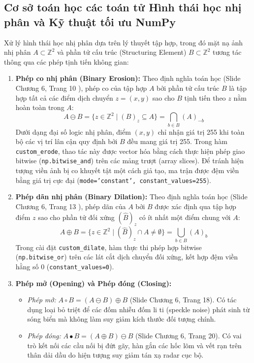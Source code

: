 \subsection{Cơ sở toán học các toán tử Hình thái học nhị phân và Kỹ thuật tối ưu NumPy}
\label{subsec:morphology_theory}
Xử lý hình thái học nhị phân dựa trên lý thuyết tập hợp, trong đó mặt nạ ảnh nhị phân $A \subset \mathbb{Z}^2$ và phần tử cấu trúc (Structuring Element) $B \subset \mathbb{Z}^2$ tương tác thông qua các phép tịnh tiến không gian:

\begin{enumerate}
    \item \textbf{Phép co nhị phân (Binary Erosion):}
    Theo định nghĩa toán học (Slide Chương 6, Trang 10 \cite{toan2024xla}), phép co của tập hợp $A$ bởi phần tử cấu trúc $B$ là tập hợp tất cả các điểm dịch chuyển $z = (x, y)$ sao cho $B$ tịnh tiến theo $z$ nằm hoàn toàn trong $A$:
    \begin{equation}
        A \ominus B = \{ z \in \mathbb{Z}^2 \mid (B)_z \subseteq A \} = \bigcap_{b \in B} (A)_{-b}
    \end{equation}
    Dưới dạng đại số logic nhị phân, điểm $(x, y)$ chỉ nhận giá trị 255 khi toàn bộ các vị trí lân cận quy định bởi $B$ đều mang giá trị 255. Trong hàm \texttt{custom\_erode}, thao tác này được vector hóa bằng cách thực hiện phép giao bitwise (\texttt{np.bitwise\_and}) trên các mảng trượt (array slices). Để tránh hiện tượng viền ảnh bị co khuyết tật một cách giả tạo, ma trận được đệm viền bằng giá trị cực đại (\texttt{mode='constant', constant\_values=255}).

    \item \textbf{Phép dãn nhị phân (Binary Dilation):}
    Theo định nghĩa toán học (Slide Chương 6, Trang 13 \cite{toan2024xla}), phép dãn của $A$ bởi $B$ được xác định qua tập hợp điểm $z$ sao cho phần tử đối xứng $(\hat{B})_z$ có ít nhất một điểm chung với $A$:
    \begin{equation}
        A \oplus B = \{ z \in \mathbb{Z}^2 \mid (\hat{B})_z \cap A \neq \emptyset \} = \bigcup_{b \in B} (A)_b
    \end{equation}
    Trong cài đặt \texttt{custom\_dilate}, hàm thực thi phép hợp bitwise (\texttt{np.bitwise\_or}) trên các lát cắt dịch chuyển đối xứng, kết hợp đệm viền hằng số 0 (\texttt{constant\_values=0}).

    \item \textbf{Phép mở (Opening) và Phép đóng (Closing):}
    \begin{itemize}
        \item \textit{Phép mở:} $A \circ B = (A \ominus B) \oplus B$ (Slide Chương 6, Trang 18). Có tác dụng loại bỏ triệt để các đốm nhiễu đốm li ti (speckle noise) phát sinh từ sóng biển mà không làm suy giảm kích thước đối tượng chính.
        \item \textit{Phép đóng:} $A \bullet B = (A \oplus B) \ominus B$ (Slide Chương 6, Trang 20). Có vai trò kết nối các cầu nối bị đứt gãy, hàn gắn các hốc lõm và vết rạn trên thân dải dầu do hiện tượng suy giảm tán xạ radar cục bộ.
    \end{itemize}
\end{enumerate}


